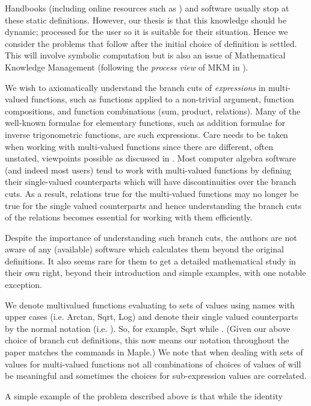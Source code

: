 \documentclass{llncs}
\begin{document}
Handbooks (including online resources such as \cite{NIST}) and software usually stop at these  static definitions.  However, our thesis is that this knowledge should be dynamic; processed for the user so it is suitable for their situation.  Hence we consider the problems that follow after the initial choice of definition is settled.  This will involve symbolic computation but is also an issue of Mathematical Knowledge Management (following the \emph{process view} of MKM in \cite{CF09}).  

We wish to axiomatically understand the branch cuts of \emph{expressions} in multi-valued functions, such as functions applied to a non-trivial argument, function compositions, and function combinations (sum, product, relations).  
Many of the well-known formulae for elementary functions, such as addition formulae for inverse trigonometric functions, are such expressions.  Care needs to be taken when working with multi-valued functions since there are different, often unstated, viewpoints possible as discussed in \cite{Davenport07, Davenport10}.  Most computer algebra software (and indeed most users) tend to work with multi-valued functions by defining their single-valued counterparts which will have discontinuities over the branch cuts.  As a result, relations true for the multi-valued functions may no longer be true for the single valued counterparts and hence understanding the branch cuts of the relations becomes essential for working with them efficiently.  

Despite the importance of understanding such branch cuts, the authors are not aware of any (available) software which calculates them beyond the original definitions.  It also seems rare for them to get a detailed mathematical study in their own right, beyond their introduction and simple examples, with \cite{Markushevich1965a} one notable exception.

We denote multivalued functions evaluating to sets of values using names with upper cases (i.e. Arctan, Sqrt, Log) and denote their single valued counterparts by the normal notation (i.e. ).  So, for example, Sqrt while .  (Given our above choice of branch cut definitions, this now means our notation throughout the paper matches the commands in {\sc Maple}.)  We note that when dealing with sets of values for multi-valued functions not all combinations of choices of values of will be meaningful and sometimes the choices for sub-expression values are correlated.  

A simple example of the problem described above is that while the identity
\end{document}
